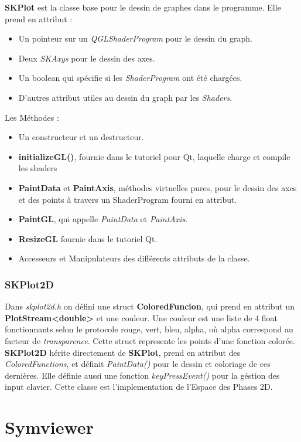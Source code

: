 \documentclass{report}
\begin{document}
\textbf{SKPlot} est la classe base pour le dessin de graphes dans le programme. 
Elle prend en attribut :
\begin{itemize}
\item  Un pointeur sur un \textit{QGLShaderProgram} pour le dessin du graph.
\item  Deux \textit{SKAxys} pour le dessin des axes. 
\item  Un boolean qui spécifie si les \textit{ShaderProgram} ont été chargées.
\item  D'autres attribut utiles au dessin du graph par les \textit{Shaders}.
\end{itemize}
Les Méthodes :
\begin{itemize}
\item Un constructeur et un destructeur.
\item \textbf{initializeGL()}, fournie dans le tutoriel pour Qt, laquelle charge et compile les shaders
\item \textbf{PaintData} et \textbf{PaintAxis}, méthodes virtuelles pures, pour le dessin des axes et des points à travers un ShaderProgram fourni en attribut.
\item \textbf{PaintGL}, qui appelle \textit{PaintData} et \textit{PaintAxis}.
\item \textbf{ResizeGL} fournie dans le tutoriel Qt.
\item Accesseurs et Manipulateurs des différents attributs de la classe.
\end{itemize}

\subsection{SKPlot2D}

Dans \textit{skplot2d.h} on défini une struct \textbf{ColoredFuncion}, qui prend en attribut un \textbf{PlotStream<double>} et une couleur.
Une couleur est une liste de 4 float fonctionnants selon le protocole rouge, vert, bleu, alpha, où alpha correspond au facteur de \textit{transparence}.
Cette struct represente les points d'une fonction colorée.
\\
\textbf{SKPlot2D} hérite directement de \textbf{SKPlot}, prend en attribut des \textit{ColoredFunctions}, et définit \textit{PaintData()} pour le dessin et coloriage de ces dernières.
Elle définie aussi une fonction \textit{keyPressEvent()} pour la géstion des input clavier.
Cette classe est l'implementation de l'Espace des Phases 2D.

\chapter{Symviewer}
\end{document}
